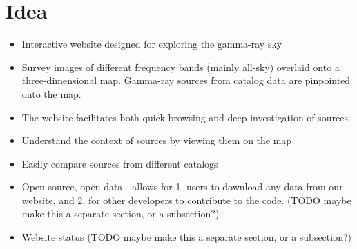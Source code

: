 \section{Idea}

\begin{itemize}

\item Interactive website designed for exploring the gamma-ray sky

\item Survey images of different frequency bands (mainly all-sky) overlaid onto a three-dimensional map. Gamma-ray sources from catalog data are pinpointed onto the map.

\item The website facilitates both quick browsing and deep investigation of sources

\item Understand the context of sources by viewing them on the map

\item Easily compare sources from different catalogs

\item Open source, open data - allows for 1. users to download any data from our website, and 2. for other developers to contribute to the code.
(TODO maybe make this a separate section, or a subsection?)

\item Website status
(TODO maybe make this a separate section, or a subsection?)

\end{itemize}
